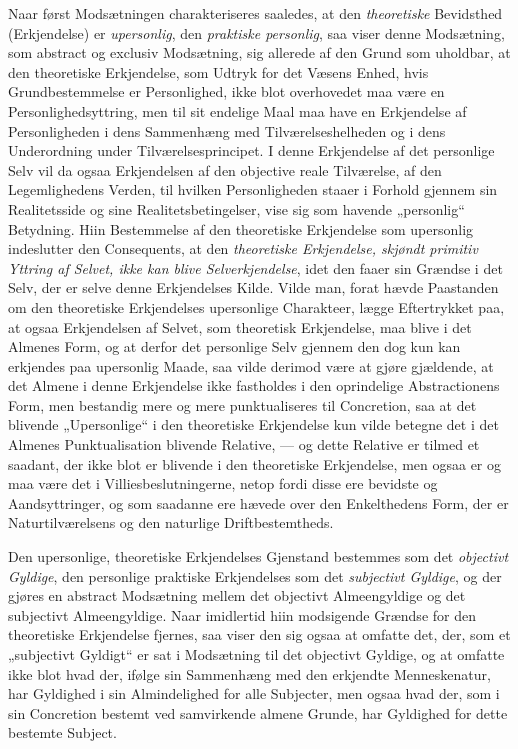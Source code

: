 Naar først Modsætningen charakteriseres saaledes, at den \emph{theoretiske}
Bevidsthed (Erkjendelse) er \emph{upersonlig}, den \emph{praktiske
personlig}, saa viser denne Modsætning, som abstract og exclusiv Modsætning,
sig allerede af den Grund som uholdbar, at den theoretiske Erkjendelse, som
Udtryk for det Væsens Enhed, hvis Grundbestemmelse er Personlighed, ikke blot
overhovedet maa være en Personlighedsyttring, men til sit endelige Maal maa
have en Erkjendelse af Personligheden i dens Sammenhæng med Tilværelseshelheden
og i dens Underordning under Tilværelsesprincipet. I denne Erkjendelse af det
personlige Selv vil da ogsaa Erkjendelsen af den objective reale Tilværelse,
af den Legemlighedens Verden, til hvilken Personligheden staaer i Forhold
gjennem sin Realitetsside og sine Realitetsbetingelser, vise sig som havende
„personlig“ Betydning. Hiin Bestemmelse af den theoretiske Erkjendelse som
upersonlig indeslutter den Consequents, at den \emph{theoretiske Erkjendelse,
skjøndt primitiv Yttring af Selvet, ikke kan blive Selverkjendelse}, idet den
faaer sin Grændse i det Selv, der er selve denne Erkjendelses Kilde. Vilde
man, forat hævde Paastanden om den theoretiske Erkjendelses upersonlige
Charakteer, lægge Eftertrykket paa, at ogsaa Erkjendelsen af Selvet, som
theoretisk Erkjendelse, maa blive i det Almenes Form, og at derfor det
personlige Selv gjennem den dog kun kan erkjendes paa upersonlig Maade, saa
vilde derimod være at gjøre gjældende, at det Almene i denne Erkjendelse ikke
fastholdes i den oprindelige Abstractionens Form, men bestandig mere og mere
punktualiseres til Concretion, saa at det blivende „Upersonlige“ i den
theoretiske Erkjendelse kun vilde betegne det i det Almenes Punktualisation
blivende Relative, --- og dette Relative er tilmed et
 saadant, der ikke blot er blivende i den theoretiske Erkjendelse, men ogsaa er
og maa være det i Villiesbeslutningerne, netop fordi disse ere bevidste og
Aandsyttringer, og som saadanne ere hævede over den Enkelthedens Form, der er
Naturtilværelsens og den naturlige Driftbestemtheds.

Den upersonlige, theoretiske Erkjendelses Gjenstand bestemmes som det
\emph{objectivt Gyldige}, den personlige praktiske Erkjendelses som det
\emph{subjectivt Gyldige}, og der gjøres en abstract Modsætning mellem det
objectivt Almeengyldige og det subjectivt Almeengyldige. Naar imidlertid hiin
modsigende Grændse for den theoretiske Erkjendelse fjernes, saa viser den sig
ogsaa at omfatte det, der, som et „subjectivt Gyldigt“ er sat i Modsætning til
det objectivt Gyldige, og at omfatte ikke blot hvad der, ifølge sin
Sammenhæng med den erkjendte Menneskenatur, har Gyldighed i sin Almindelighed
for alle Subjecter, men ogsaa hvad der, som i sin Concretion bestemt ved
samvirkende almene Grunde, har Gyldighed for dette bestemte Subject.

